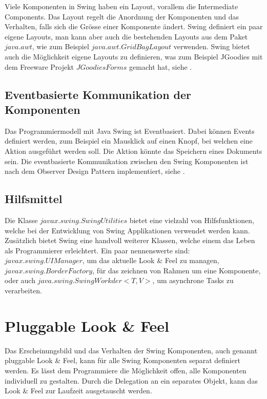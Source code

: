   Viele Komponenten in Swing haben ein Layout, vorallem die Intermediate
  Components. Das Layout regelt die Anordnung der Komponenten und das Verhalten,
  falls sich die Grösse einer Komponente ändert. Swing definiert ein paar eigene
  Layouts, man kann aber auch die bestehenden Layouts aus dem Paket
  \(java.awt\), wie zum Beispiel \(java.awt.GridBagLayout\) verwenden. Swing
  bietet auch die Möglichkeit eigene Layouts zu definieren, was zum Beispiel
  JGoodies mit dem Freeware Projekt \(JGoodies Forms\) gemacht hat, siehe
  \cite{JGoodiesForms}.
    
  \subsection{Eventbasierte Kommunikation der Komponenten}
  
  Das Programmiermodell mit Java Swing ist Eventbasiert. Dabei können Events
  definiert werden, zum Beispiel ein Mausklick auf einen Knopf, bei welchen
  eine Aktion ausgeführt werden soll. Die Aktion könnte das Speichern eines
  Dokuments sein. Die eventbasierte Kommunikation zwischen den Swing
  Komponenten ist nach dem Observer Design Pattern implementiert, siehe
  \cite{ObserverDesignPattern}.
  
  \subsection{Hilfsmittel}
  
  Die Klasse \(javax.swing.SwingUtilities\) bietet eine vielzahl von
  Hilfsfunktionen, welche bei der Entwicklung von Swing Applikationen verwendet
  werden kann. Zusätzlich bietet Swing eine handvoll weiterer Klassen,
  welche einem das Leben als Programmierer erleichtert. Ein paar nennenswerte
  sind: \(javax.swing.UIManager\), um das aktuelle Look \& Feel zu managen,
  \(javax.swing.BorderFactory\), für das zeichnen von Rahmen um eine
  Komponente, oder auch \(java.swing.SwingWorkder<T,V>\), um asynchrone Tasks
  zu verarbeiten.
  
  \section{Pluggable Look \& Feel}
  
  Das Erscheinungsbild und das Verhalten der Swing Komponenten, auch genannt
  pluggable Look \& Feel, kann für alle Swing Komponenten separat definiert
  werden. Es lässt dem Programmiere die Möglichkeit offen, alle Komponenten
  individuell zu gestalten. Durch die Delegation an ein separates Objekt, kann
  das Look \& Feel zur Laufzeit ausgetauscht werden.
  

